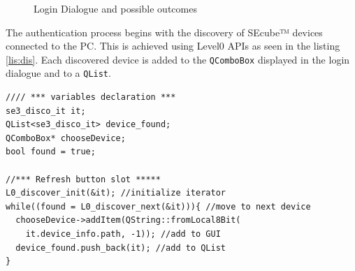 \begin{figure}[ht]
  \centering
  {}
  {}
  \caption{Login Dialogue and possible outcomes}
 \label{fig:login}
\end{figure}

The authentication process begins with the discovery of SEcube™ devices connected to the PC. This is achieved using Level0 APIs as seen in the listing \ref{lis:dis}. Each discovered device is added to the \texttt{QComboBox} displayed in the login dialogue and to a \texttt{QList}.

\begin{lstlisting}[style=customc, float=htb, caption={Connected Devices discovery}, label = {lis:dis}]
//// *** variables declaration ***
se3_disco_it it;
QList<se3_disco_it> device_found;
QComboBox* chooseDevice;
bool found = true;

//*** Refresh button slot *****
L0_discover_init(&it); //initialize iterator
while((found = L0_discover_next(&it))){ //move to next device
  chooseDevice->addItem(QString::fromLocal8Bit(
    it.device_info.path, -1)); //add to GUI
  device_found.push_back(it); //add to QList
}
\end{lstlisting}

